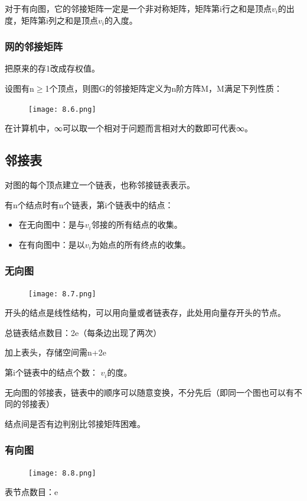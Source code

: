 \documentclass[AutoFakeBold]{LZUThesis2007}
\begin{document}
对于有向图，它的邻接矩阵一定是一个非对称矩阵，矩阵第i行之和是顶点$v_{i}$的出度，矩阵第i列之和是顶点$v_{i}$的入度。
			\subsubsection{网的邻接矩阵}
把原来的存1改成存权值。

设图有n$\ge$1个顶点，则图G的邻接矩阵定义为n阶方阵M，M满足下列性质：

\begin{figure}[H]
    \centering
    \texttt{[image: 8.6.png]}

\end{figure}

在计算机中，∞可以取一个相对于问题而言相对大的数即可代表∞。
		\subsection{邻接表}
对图的每个顶点建立一个链表，也称邻接链表表示。

有n个结点时有n个链表，第i个链表中的结点：
			\begin{itemize}
				\item 在无向图中：是与$v_{i}$邻接的所有结点的收集。
				\item 在有向图中：是以$v_{i}$为始点的所有终点的收集。
			\end{itemize}

			\subsubsection{无向图}
\begin{figure}[H]
    \centering
    \texttt{[image: 8.7.png]}

\end{figure}
开头的结点是线性结构，可以用向量或者链表存，此处用向量存开头的节点。

总链表结点数目：2e（每条边出现了两次）

加上表头，存储空间需n+2e

第i个链表中的结点个数： $v_{i}$的度。

无向图的邻接表，链表中的顺序可以随意变换，不分先后（即同一个图也可以有不同的邻接表）

结点间是否有边判别比邻接矩阵困难。
			\subsubsection{有向图}
\begin{figure}[H]
    \centering
    \texttt{[image: 8.8.png]}

\end{figure}
表节点数目：e
\end{document}

